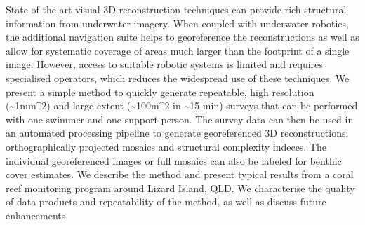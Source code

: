 
State of the art visual 3D reconstruction techniques can provide rich structural information from underwater imagery. When coupled with underwater robotics, the additional navigation suite helps to georeference the reconstructions as well as allow for systematic coverage of areas much larger than the footprint of a single image. However, access to suitable robotic systems is limited and requires specialised operators, which reduces the widespread use of these techniques.
We present a simple method to quickly generate repeatable, high resolution (\sim{1mm^{2}}) and large extent (\sim{100m^{2}} in \sim{15 min}) surveys that can be performed with one swimmer and one support person. The survey data can then be used in an automated processing pipeline to generate georeferenced 3D reconstructions, orthographically projected mosaics and structural complexity indeces. The individual georeferenced images or full mosaics can also be labeled for benthic cover estimates.
We describe the method and present typical results from a coral reef monitoring program around Lizard Island, QLD. We characterise the quality of data products and repeatability of the method, as well as discuss future enhancements.
  
  
